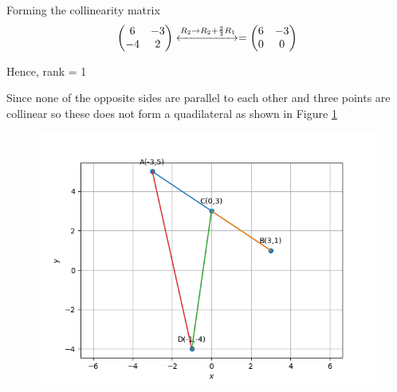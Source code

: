 \documentclass[12pt]{article}
\newcommand{\myvec}[1]{\ensuremath{\begin{pmatrix}#1\end{pmatrix}}}
\begin{document}
\begin{enumerate}
\begin{enumerate}
	Forming the collinearity matrix
	\begin{align}
		\myvec{6&-3\\-4&2} \xleftrightarrow{R_{2}\rightarrow R_{2}+\frac{2}{3}R_{1}}= \myvec{6&-3\\0&0}
	\end{align}
	\end{enumerate}
	Hence, rank = 1

	Since none of the opposite sides are parallel to each other and three points are collinear so these does not form a quadilateral as shown in Figure \ref{fig:Fig2}
	
\begin{figure}[!h]
	\begin{center} 
	    \includegraphics[width=\columnwidth]{figs/quad2}
	\end{center}
\caption{}
\label{fig:Fig2}
\end{figure}
	

\end{enumerate}
\end{document}
